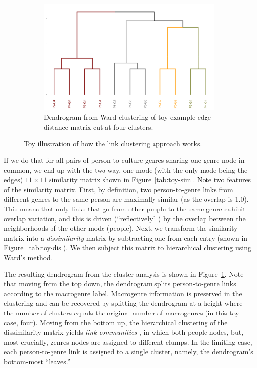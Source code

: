 \documentclass[a4paper,12pt]{extarticle}
\begin{document}
\begin{figure}
\begin{subfigure}[b]{0.4\textwidth}
    \end{subfigure}
     \begin{subfigure}[b]{0.6\textwidth}
        \includegraphics[width=1.0\textwidth]{Toy/link-clust-toy.png}
        \caption{Dendrogram from Ward clustering of toy example edge distance matrix cut at four clusters.}
        \label{fig:link-toy}
    \end{subfigure}
    \caption{Toy illustration of how the link clustering approach works.}
    \label{fig:link-toy-ex}
 \end{figure}

If we do that for all pairs of person-to-culture genres sharing one genre node in common, we end up with the two-way, one-mode (with the only mode being the edges) $11 \times 11$ similarity matrix shown in Figure~\ref{tab:toy-sim}. Note two features of the similarity matrix. First, by definition, two person-to-genre links from different genres to the same person are maximally similar (as the overlap is 1.0). This means that only links that go from other people to the same genre exhibit overlap variation, and this is driven (``reflectively'' \citep{lizardo18}) by the overlap between the neighborhoods of the other mode (people). Next, we transform the similarity matrix into a {\em dissimilarity} matrix by subtracting one from each entry (shown in  Figure~\ref{tab:toy-dis}). We then subject this matrix to hierarchical clustering using Ward's \citeyearpar{ward63} method. 

The resulting dendrogram from the cluster analysis is shown in Figure~\ref{fig:link-toy}. Note that moving from the top down, the dendrogram splits person-to-genre links according to the macrogenre label. Macrogenre information is preserved in the clustering and can be recovered by splitting the dendrogram at a height where the number of clusters equals the original number of macrogenres (in this toy case, four). Moving from the bottom up, the hierarchical clustering of the dissimilarity matrix yields {\em link communities} \citep{ahn_etal10}, in which both people nodes, but, most crucially, genres nodes are assigned to different clumps. In the limiting case, each person-to-genre link is assigned to a single cluster, namely, the dendrogram's bottom-most ``leaves.'' 
\end{document}
